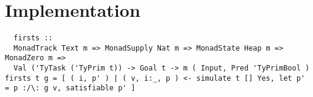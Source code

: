 
\section{Implementation}
\label{sec:implementation}


\begin{verbatim}
  firsts ::
  MonadTrack Text m => MonadSupply Nat m => MonadState Heap m => MonadZero m =>
  Val ('TyTask ('TyPrim t)) -> Goal t -> m ( Input, Pred 'TyPrimBool )
firsts t g = [ ( i, p' ) | ( v, i:_, p ) <- simulate t [] Yes, let p' = p :/\: g v, satisfiable p' ]

\end{verbatim}
